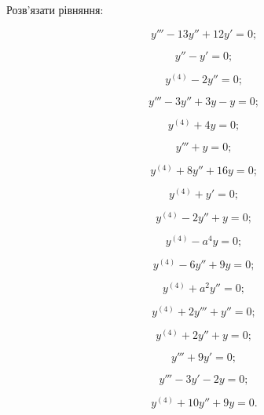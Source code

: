 Розв'язати рівняння:
\begin{multicols}{2}
    \begin{problem}
    	\[y'''-13y''+12y'=0;\]
    \end{problem}

    \begin{problem}
    	\[y''-y'=0;\]
    \end{problem}

    \begin{problem}
    	\[y^{(4)}-2y''=0;\]
    \end{problem}

    \begin{problem}
    	\[y'''-3y''+3y-y=0;\]
    \end{problem}

    \begin{problem}
    	\[y^{(4)}+4y=0;\]
    \end{problem}

    \begin{problem}
    	\[y'''+y=0;\]
    \end{problem}

    \begin{problem}
    	\[y^{(4)}+8y''+16y=0;\]
    \end{problem}

    \begin{problem}
    	\[y^{(4)}+y'=0;\]
    \end{problem}

    \begin{problem}
    	\[y^{(4)}-2y''+y=0;\]
    \end{problem}

    \begin{problem}
    	\[y^{(4)}-a^4y=0;\]
    \end{problem}

    \begin{problem}
    	\[y^{(4)}-6y''+9y=0;\]
    \end{problem}

    \begin{problem}
    	\[y^{(4)}+a^2y''=0;\]
    \end{problem}

    \begin{problem}
    	\[y^{(4)}+2y'''+y''=0;\]
    \end{problem}

    \begin{problem}
    	\[y^{(4)}+2y''+y=0;\]
    \end{problem}

    \begin{problem}
    	\[y'''+9y'=0;\]
    \end{problem}

    \begin{problem}
    	\[y'''-3y'-2y=0;\]
    \end{problem}

    \begin{problem}
    	\[y^{(4)}+10y''+9y=0.\]
    \end{problem}
\end{multicols}

